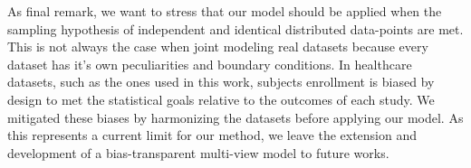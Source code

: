 As final remark, we want to stress that our model should be applied when the sampling hypothesis of independent and identical distributed data-points are met.
This is not always the case when joint modeling real datasets because every dataset has it's own peculiarities and boundary conditions.
In healthcare datasets, such as the ones used in this work, subjects enrollment is biased by design to met the statistical goals relative to the outcomes of each study.
We mitigated these biases by harmonizing the datasets before applying our model.
As this represents a current limit for our method, we leave the extension and development of a bias-transparent multi-view model to future works.

